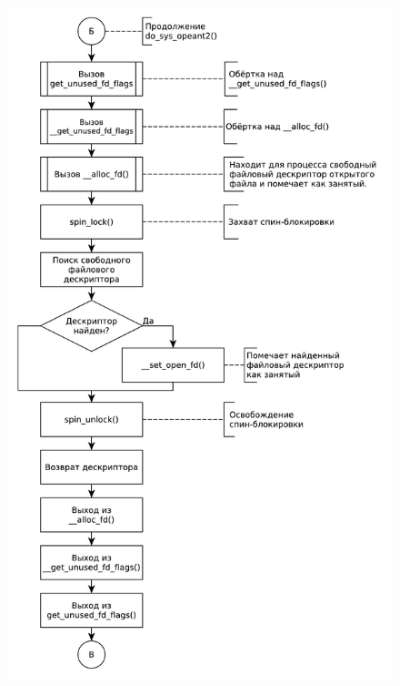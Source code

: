 \documentclass[a4paper,oneside,12pt]{extreport}
\begin{document}
\begin{figure}[H]
	\centering
	\includegraphics[scale=0.70]{inc/img/open3}
\end{figure}
\end{document}

